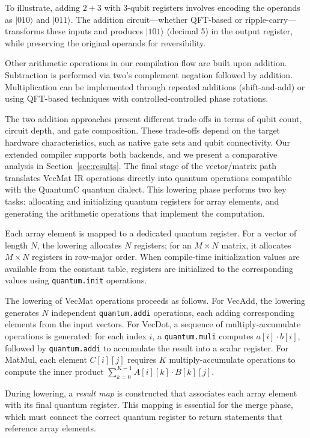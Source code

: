 To illustrate, adding $2 + 3$ with 3-qubit registers involves encoding the operands as $|010\rangle$ and $|011\rangle$. The addition circuit---whether QFT-based or ripple-carry---transforms these inputs and produces $|101\rangle$ (decimal 5) in the output register, while preserving the original operands for reversibility.

Other arithmetic operations in our compilation flow are built upon addition. Subtraction is performed via two's complement negation followed by addition. Multiplication can be implemented through repeated additions (shift-and-add) or using QFT-based techniques with controlled-controlled phase rotations.

The two addition approaches present different trade-offs in terms of qubit count, circuit depth, and gate composition. These trade-offs depend on the target hardware characteristics, such as native gate sets and qubit connectivity. Our extended compiler supports both backends, and we present a comparative analysis in Section~\ref{sec:results}.
The final stage of the vector/matrix path translates VecMat IR operations directly into quantum operations compatible with the QuantumC quantum dialect. This lowering phase performs two key tasks: allocating and initializing quantum registers for array elements, and generating the arithmetic operations that implement the computation.

Each array element is mapped to a dedicated quantum register. For a vector of length $N$, the lowering allocates $N$ registers; for an $M \times N$ matrix, it allocates $M \times N$ registers in row-major order. When compile-time initialization values are available from the constant table, registers are initialized to the corresponding values using \texttt{quantum.init} operations.

The lowering of VecMat operations proceeds as follows. For VecAdd, the lowering generates $N$ independent \texttt{quantum.addi} operations, each adding corresponding elements from the input vectors. For VecDot, a sequence of multiply-accumulate operations is generated: for each index $i$, a \texttt{quantum.muli} computes $a[i] \cdot b[i]$, followed by \texttt{quantum.addi} to accumulate the result into a scalar register. For MatMul, each element $C[i][j]$ requires $K$ multiply-accumulate operations to compute the inner product $\sum_{k=0}^{K-1} A[i][k] \cdot B[k][j]$.

During lowering, a \emph{result map} is constructed that associates each array element with its final quantum register. This mapping is essential for the merge phase, which must connect the correct quantum register to return statements that reference array elements.

